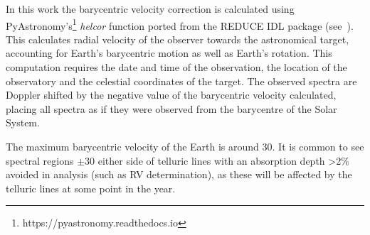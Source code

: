 In this work the barycentric velocity correction is calculated using PyAstronomy's\footnote{https://pyastronomy.readthedocs.io} \emph{helcor} function ported from the REDUCE IDL package (see~\citet[][]{piskunov_new_2002}).
This calculates radial velocity of the observer towards the astronomical target, accounting for Earth's barycentric motion as well as Earth's rotation.
This computation requires the date and time of the observation, the location of the observatory and the celestial coordinates of the target.
The observed spectra are Doppler shifted by the negative value of the barycentric velocity calculated, placing all spectra as if they were observed from the barycentre of the Solar System.

The maximum barycentric velocity of the Earth is around 30\kmps{}.
It is common to see spectral regions $\pm30$\kmps{} either side of telluric lines with an absorption depth >2\% avoided in analysis (such as RV determination), as these will be affected by the telluric lines at some point in the year.
